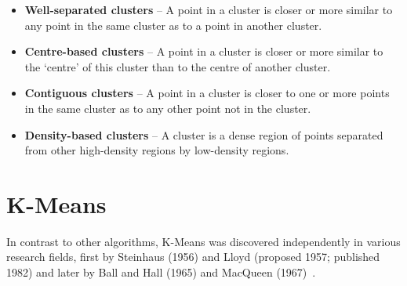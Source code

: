 \documentclass[10pt,twocolumn,letterpaper]{article}
\begin{document}
\begin{itemize}
    \item \textbf{Well-separated clusters} – A point in a cluster is closer or more similar to any point in the same cluster
          as to a point in another cluster.
    \item \textbf{Centre-based clusters} – A point in a cluster is closer or more similar to the ‘centre’ of this cluster
          than to the centre of another cluster.
    \item \textbf{Contiguous clusters} – A point in a cluster is closer to one or more points in the same cluster as to
          any other point not in the cluster.
    \item \textbf{Density-based clusters} – A cluster is a dense region of points separated from other high-density
          regions by low-density regions.
\end{itemize}


\section{K-Means}\label{sec:k-means}

In contrast to other algorithms, K-Means was discovered independently in
various research fields, first by Steinhaus (1956) and Lloyd (proposed 1957;
published 1982) and later by Ball and Hall (1965) and MacQueen
(1967)~\cite{Jain2010651}.
\end{document}

